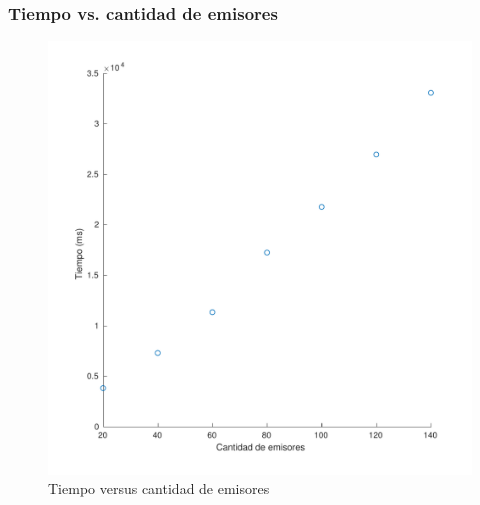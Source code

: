 \documentclass[11pt]{beamer}
\begin{document}
\begin{frame}
    \frametitle{Tiempo vs. cantidad de emisores}
    \begin{figure}[H]
        \centering
            
                \includegraphics[scale=0.45]{img/emi_tiempo-eps-converted-to.pdf}
                \caption{Tiempo versus cantidad de emisores}
                \label{fig:tiempo versus emisores}
            
    \end{figure}
\end{frame}
    
\end{document}
